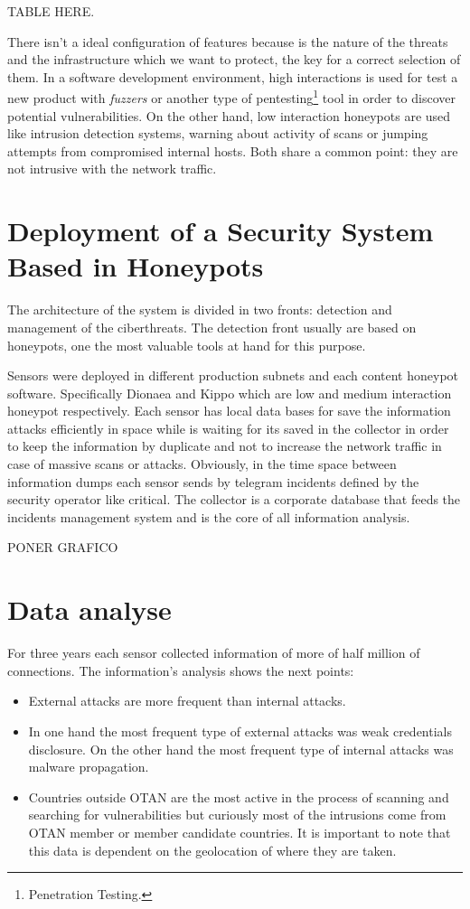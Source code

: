 \documentclass[a4paper]{llncs}
\begin{document}
TABLE HERE.

There isn't a ideal configuration of features because is the nature of the threats and the infrastructure which we want to protect, the key for a correct selection of them. In a software development environment, high interactions is used for test a new product with {\it fuzzers} or another type of pentesting\footnote{Penetration Testing.} tool in order to discover potential vulnerabilities. On the other hand, low interaction honeypots are used like intrusion detection systems, warning about activity of scans or jumping attempts from compromised internal hosts. Both share a common point: they are not intrusive with the network traffic.

\section{Deployment of a Security System Based in Honeypots}
The architecture of the system is divided in two fronts: detection and management of the ciberthreats. The detection front usually are based on honeypots, one the most valuable tools at hand for this purpose.

Sensors were deployed in different production subnets and each content honeypot software. Specifically Dionaea\cite{dionaea} and Kippo\cite{kippo} which are low and medium interaction honeypot respectively. Each sensor has local data bases for save the information attacks efficiently in space while is waiting for its saved in the collector in order to keep the information by duplicate and not to increase the network traffic in case of massive scans or attacks. Obviously, in the time space between information dumps each sensor sends by telegram incidents defined by the security operator like critical. The collector is a corporate database that feeds the incidents management system and is the core of all information analysis.

PONER GRAFICO

\section{Data analyse}
For three years each sensor collected information of more of half million of connections. The information's analysis shows the next points:
\begin{itemize}
\item External attacks are more frequent than internal attacks.
\item In one hand the most frequent type of external attacks was weak credentials disclosure. On the other hand the most frequent type of internal attacks was malware propagation.
\item Countries outside OTAN are the most active in the process of scanning and searching for vulnerabilities but curiously most of the intrusions come from OTAN member or member candidate countries. It is important to note that this data is dependent on the geolocation of where they are taken.
\end{itemize}
\end{document}
